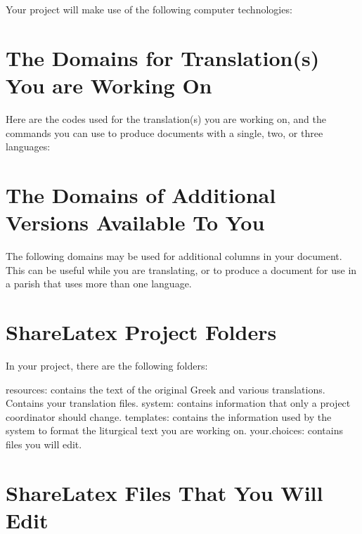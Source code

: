 \documentclass[]{memoir}
\begin{document}
Your project will make use of the following computer technologies:


\section{The Domains for Translation(s) You are Working On}

Here are the codes used for the translation(s) you are working on, and the commands you can use to produce documents with a single, two, or three languages:  


\section{The Domains of Additional Versions Available To You}

The following domains may be used for additional columns in your document.  This can be useful while you are translating, or to produce a document for use in a parish that uses more than one language.


\section{ShareLatex Project Folders}

In your project, there are the following folders:

\pex

\a resources: contains the text of the original Greek and various translations.  Contains your translation files.
\a system: contains information that only a project coordinator should change.
\a templates: contains the information used by the system to format the liturgical text you are working on.
\a your.choices: contains files you will edit.
\xe

\section{ShareLatex Files That You Will Edit}
\end{document}
